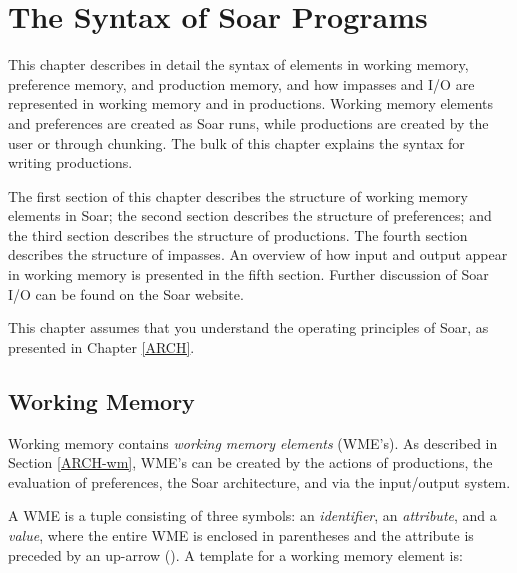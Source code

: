 \chapter{The Syntax of Soar Programs}
\label{SYNTAX}

This chapter describes in detail the syntax of elements in working memory, preference memory, and production memory, and how impasses and I/O are represented in working memory and in productions. Working memory elements and preferences are created as Soar runs, while productions are created by the user or through chunking. The bulk of this chapter explains the syntax for writing productions.

The first section of this chapter describes the structure of working memory elements in Soar; the second section describes the structure of preferences; and the third section describes the structure of productions. The fourth section describes the structure of impasses. An overview of how input and output appear in working memory is presented in the fifth section. Further discussion of Soar I/O can be found on the Soar website.

This chapter assumes that you understand the operating principles of Soar, as presented in Chapter \ref{ARCH}.

\section{Working Memory}
\label{SYNTAX-wm}

Working memory contains \emph{working memory elements} (WME's). As described in Section \ref{ARCH-wm}, WME's can be created by the actions of productions, the evaluation of preferences, the Soar architecture, and via the input/output system.

A WME is a tuple consisting of three symbols: an {\em identifier}, an \emph{attribute}, and a \emph{value}, where the entire WME is enclosed in parentheses and the attribute is preceded by an up-arrow (\carat ). A template for a working memory element is:

